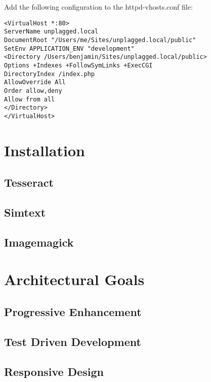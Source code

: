 Add the following configuration to the httpd-vhosts.conf file:
\begin{lstlisting}[caption=Apache configuration]
<VirtualHost *:80>
ServerName unplagged.local
DocumentRoot "/Users/me/Sites/unplagged.local/public" 
SetEnv APPLICATION_ENV "development" 
<Directory /Users/benjamin/Sites/unplagged.local/public>
Options +Indexes +FollowSymLinks +ExecCGI
DirectoryIndex /index.php
AllowOverride All
Order allow,deny
Allow from all
</Directory>
</VirtualHost>
\end{lstlisting}

\section{Installation}
\subsection{Tesseract}
\subsection{Simtext}
\subsection{Imagemagick}



\section{Architectural Goals}

\subsection{Progressive Enhancement}

\subsection{Test Driven Development}

\subsection{Responsive Design}